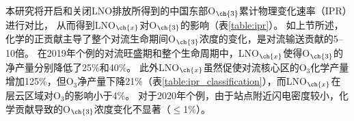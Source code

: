 本研究将开启和关闭LNO排放所得到的中国东部O$_{\ch{3}}$累计物理变化速率（IPR）进行对比，
从而得到LNO$_{\ch{x}}$对O$_{\ch{3}}$的影响（表\ref{table:ipr}）。
如上节所述，化学的正贡献主导了整个对流生命期间O$_{\ch{3}}$浓度的变化，是对流输送贡献的5--10倍。
在2019年个例的对流旺盛期和整个生命周期中，LNO$_{\ch{x}}$使得O$_{\ch{3}}$的净产量分别降低了25\%和40\%。
此外LNO$_{\ch{x}}$虽然促使对流核心区的O$_3$化学产量增加125\%，但O$_3$净产量下降21\%（表\ref{table:ipr_classification}），而LNO$_{\ch{x}}$在层云区域对O$_3$的影响小于4\%。
对于2020年个例，由于站点附近闪电密度较小，化学贡献导致的O$_{\ch{3}}$浓度变化不显著（$\leq$1\%）。



